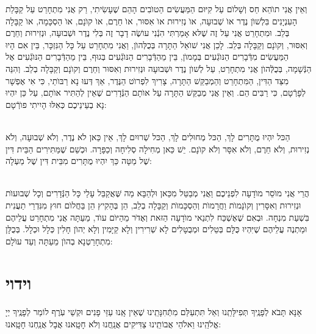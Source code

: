 \documentclass[twoside, openany, parskip=half, 11pt]{book}
\begin{document}
 וְאֵין אֲנִי תוׂהֵא חַס וְשָׁלוׂם עַל קִיּוּם הַמַּעֲשִׂים הַטוׂבִים הָהֵם שֶׁעָשִׂיתִי, רַק אֲנִי מִתְחָרֵט עַל קַבָּלַת הָעִנְיָנִים בִּלְשׁוׂן נֶדֶר אוׂ שְׁבוּעָה, אוׂ נְזִירוּת אוׂ אִסּוּר, אוׂ חֵרֶם, אוׂ קוׂנָם, אוׂ הַסְכָּמָה, אוׂ קַבָּלָה בְּלֵב. וּמִתְחָרֵט אֲנִי עַל זֶה שֶׁלּא אָמַרְתִּי הִנְֿנִי עוׂשֶׂה דָבָר זֶה בְּלִי נֶדֶר וּשְׁבוּעָה, וּנְזִירוּת וְחֵרֶם וְאִסּוּר, וְקוׂנָם וְקַבָּלָה בְּלֵב. לָכֵן אֲנִי שׁוׂאֵל הַתָּרָה בְּכֻלְּהוׂן, וַאֲנִי מִתְחָרֵט עַל כָּל הַנִּזְכָּר, בֵּין אִם הָיוּ הַמַּעֲשִׂים מִדְּֿבָרִים הַנּוׂגְֿעִים בְּמָמוׂן, בֵּין מֵהַדְּֿבָרִים הַנּוׂגְֿעִים בְּגוּף, בֵּין מֵהַדְּֿבָרִים הַנּוׂגְֿעִים אֶל הַנְּֿשָׁמָה, בְּכֻלְּֿהוׂן אֲנִי מִתְחָרֵט, עַל לְשׁוׂן נֶדֶר וּשְׁבוּעָה וּנְזִירוּת וְאִסּוּר וְחֵרֶם וְקוׂנָם וְקַבָּלָה בְלֵב. וְהִנֵּה מִצַּד הַדִּין, הַמִּתְחָרֵט וְהַמְבַקֵּשׁ הַתָּרָה, צָרִיךְ לִפְרוׂט הַנֶּדֶר, אַךְ דְּעוּ נָא רַבּוׂתַי, כִּי אִי אֶפְשָׁר לְפָרְֿטָם, כִּי רַבִּים הֵם. וְאֵין אֲנִי מְבַקֵּשׁ הַתָּרָה עַל אוׂתָם הַנְּֿדָרִים שֶׁאֵין לְהַתִּיר אוׂתָם, עַל כֵּן יִהְיוּ נָא בְעֵינֵיכֶם כְּאִלּוּ הָיִיתִי פוׂרְֿטָם:

\\
הַכּל יִהְיוּ מֻתָּרִים לָךְ, הַכּל מְחוּלִים לָךְ, הַכּל שְׁרוּיִם לָךְ, אֵין כַּאן לֺא נֶדֶר, וְלֺא שְׁבוּעָה, וְלֺא נְזִירוּת, וְלֺא חֵרֶם, וְלֺא אִסָּר וְלֺא קוׂנָם. יֵשׁ כַּאן מְחִילָה סְלִיחָה וְכַפָּרָה. וּכְשֵׁם שֶׁמַּתִּירִים הַבֵּית דִּין שֶׁל מַטָּה כַּךְ יִהְיוּ מֻתָּרִים מִבֵּית דִּין שֶׁל מַעְלָה:

\\
הֲרֵי אֲנִי מוֺסֵר מוׂדָעָה לִפְנֵיכֶם וַאֲנִי מְבַטֵּל מִכַּאן וּלְהַבָּא מַה שֶּׁאֲקַבֵּל עָלַי כָּל הַנְּֿדָרִים וְכָל שְׁבוּעוׂת וּנְזִירוּת וְאִסָּרִין וְקוׂנָמוׂת וַחֲרָמוׂת וְהַסְכָּמוׂת וְקַבָּלָה בְלֵב, הֵן בְּהָקִיץ הֵן בַּחֲלוׂם חוּץ מִנִּדְרֵי תַעֲנִית בִּשְׁעַת מִנְחָה. וּבְאִם שֶׁאֶשְׁכַּח לִתְנַאי מוׂדָעָה הַזּאת וְאֶדּׂר מֵהַיּוׂם עוׂד, מֵעַתָּה אֲנִי מִתְחָרֵט עֲלֵיהֶם וּמַתְנֶה עֲלֵיהֶם שֶׁיִּהְיוּ כֻּלָּם בְּטֵלִים וּמְבֻטָּלִים לָא שְׁרִירִין וְלָא קַיָּמִין וְלָא יְהוׂן חָלִין כְּלָל וּכְלָל. בְּכֻלָּן מִתְחָרַטְנָא בְהוׂן מֵעַתָּה וְעַד עוׂלָם:

\vfill
\sepline




\chapter[וידוי]{ וידוי }

אָנָּא תָּבֹא לְפָנֶֽיךָ תְּפִילָּתֵֽנוּ וְאַל תִּתְעַלַּם מִתְּֿחִנָּתֵֽינוּ שֶׁאֵין אָֽנוּ עַזֵּי פָנִים וּקְשֵׁי עֹֽרֶף לוֹמַר לְפָנֶֽיךָ יְיָ אֱלֹהֵֽינוּ וֵאלֹהֵי אֲבוֹתֵֽינוּ צַדִּיקִים אֲנַֽחֲנוּ וְלֹא חָטָֽאנוּ אֲבָל אֲנַֽחְנוּ חָטָֽאנוּ: 
\end{document}
